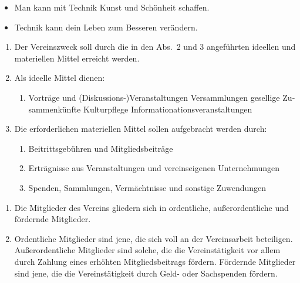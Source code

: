 \begin{otherlanguage}{german}
\begin{itemize}[statutenenum]
    \item Man kann mit Technik Kunst und Schönheit schaffen.

    \item Technik kann dein Leben zum Besseren verändern.
\end{itemize}


\begin{enumerate}[statutenenum]
    \item Der Vereinszweck soll durch die in den Abs.\ 2 und 3 angeführten ideellen und materiellen Mittel erreicht werden.

    \item Als ideelle Mittel dienen:
        \begin{enumerate}[statutenenum]
            \item Vorträge und (Diskussions-)Veranstaltungen Versammlungen gesellige Zusammenkünfte Kulturpflege Informationationsveranstaltungen
        \end{enumerate}

    \item Die erforderlichen materiellen Mittel sollen aufgebracht werden durch:
        \begin{enumerate}[statutenenum]
            \item Beitrittsgebühren und Mitgliedsbeiträge

            \item Erträgnisse aus Veranstaltungen und vereinseigenen Unternehmungen

            \item Spenden, Sammlungen, Vermächtnisse und sonstige Zuwendungen
        \end{enumerate}
\end{enumerate}


\begin{enumerate}[statutenenum]
    \item Die Mitglieder des Vereins gliedern sich in ordentliche, außerordentliche und fördernde Mitglieder.

    \item Ordentliche Mitglieder sind jene, die sich voll an der Vereinsarbeit beteiligen.
        Außerordentliche Mitglieder sind solche, die die Vereinstätigkeit vor allem durch Zahlung eines erhöhten Mitgliedsbeitrags fördern.
        Fördernde Mitglieder sind jene, die die Vereinstätigkeit durch Geld- oder Sachspenden fördern.
\end{enumerate}


\end{otherlanguage}

